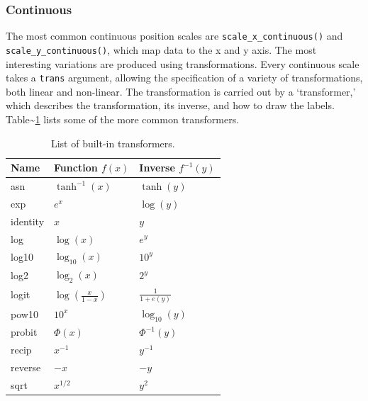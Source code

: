 \subsubsection{Continuous}\label{ssub:scale-continuous}

The most common continuous position scales are
\texttt{scale\_x\_continuous()} and \texttt{scale\_y\_continuous()},
which map data to the x and y axis. 
The most interesting variations are produced using transformations.
Every continuous scale takes a \texttt{trans} argument, allowing the
specification of a variety of transformations, both linear and
non-linear. The transformation is carried out by a `transformer,' which
describes the transformation, its inverse, and how to draw the labels.
Table\textasciitilde{}\ref{tbl:common-trans} lists some of the more
common transformers. 
 

\begin{table}
  \centering
  \begin{tabular}{lll}
    \toprule
    Name & Function $f(x)$ & Inverse $f^{-1}(y)$ \\
    \midrule
    asn       & $\tanh^{-1}(x)$ & $\tanh(y)$ \\
    exp       & $e ^ x$         & $\log(y)$  \\
    identity  & $x$             & $y$        \\
    log       & $\log(x)$       & $e ^ y$    \\
    log10     & $\log_{10}(x)$  & $10 ^ y$   \\
    log2      & $\log_2(x)$     & $2 ^ y$    \\
    logit     & $\log(\frac{x}{1 - x})$ & $\frac{1}{1 + e(y)} $ \\
    pow10     & $10^x$          & $\log_{10}(y) $ \\
    probit    & $\Phi(x)$       & $\Phi^{-1}(y)$ \\
    recip     & $x^{-1}$        & $y^{-1}$ \\
    reverse   & $-x$            & $-y$     \\
    sqrt      & $x^{1/2}$       & $y ^ 2$  \\
    \bottomrule
  \end{tabular}
  \caption{List of built-in transformers.}
  \label{tbl:common-trans}
\end{table}

